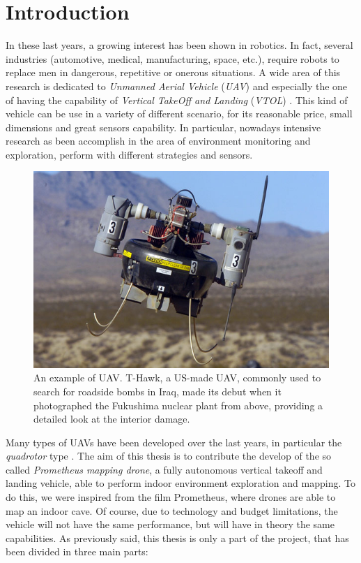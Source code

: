 \chapter{Introduction}
\label{introduction}

\renewcommand{\thepage}{\arabic{page}} 			%
\setcounter{page}{1}                   			%

In these last years, a growing interest has been shown in robotics. In fact, several industries (automotive, medical, manufacturing, space, etc.), require robots to replace men in dangerous, repetitive or onerous situations. A wide area of this research is dedicated to \textit{Unmanned Aerial Vehicle} (\textit{UAV}) and especially the one of having the capability of \textit{Vertical TakeOff and Landing} (\textit{VTOL}) \cite{largeQuadrotor}. This kind of vehicle can be use in a variety of different scenario, for its reasonable price, small dimensions and great sensors capability. In particular, nowadays intensive research as been accomplish in the area of environment monitoring and exploration, perform with different strategies and sensors.

\begin{figure}
	\includegraphics[scale=0.4]{images/fukushima.jpg}
	\caption{An example of UAV. T-Hawk, a US-made UAV, commonly used to search for roadside bombs in Iraq, made its debut when it photographed the Fukushima nuclear plant from above, providing a detailed look at the interior damage.}
	\label{fig:application}
\end{figure}  

\noindent Many types of UAVs have been developed over the last years, in particular the \textit{quadrotor} type \cite{Aalborg}. The aim of this thesis is to contribute the develop of the so called \textit{Prometheus mapping drone}, a fully autonomous vertical takeoff and landing vehicle, able to perform indoor environment exploration and mapping. To do this, we were inspired from the film Prometheus, where drones are able to map an indoor cave. Of course, due to technology and budget limitations, the vehicle will not have the same performance, but will have in theory the same capabilities. As previously said, this thesis is only a part of the project, that has been divided in three main parts:


